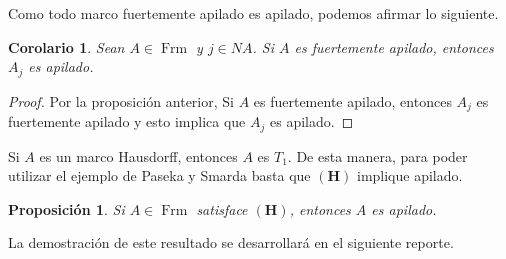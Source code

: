 \documentclass[12pt]{article}
\newtheorem{cor}[thm]{Corolario}
\newtheorem{prop}[thm]{Proposición}
\DeclareMathOperator{\Frm}{Frm}
\begin{document}
Como todo marco fuertemente apilado es apilado, podemos afirmar lo siguiente.

\begin{cor}
Sean $A\in \Frm$ y $j\in NA$. Si $A$ es fuertemente apilado, entonces $A_j$ es apilado. 
\end{cor}

\begin{proof}
Por la proposición anterior, Si $A$ es fuertemente apilado, entonces $A_j$ es fuertemente apilado y esto implica que $A_j$ es apilado.
\end{proof}

Si $A$ es un marco Hausdorff, entonces $A$ es $T_1$. De esta manera, para poder utilizar el ejemplo de Paseka y Smarda basta que $\mathbf{(H)}$ implique apilado.

\begin{prop}
Si $A\in \Frm$ satisface $\mathbf{(H)}$, entonces $A$ es apilado.
\end{prop}

La demostración de este resultado se desarrollará en el siguiente reporte.
\end{document}
